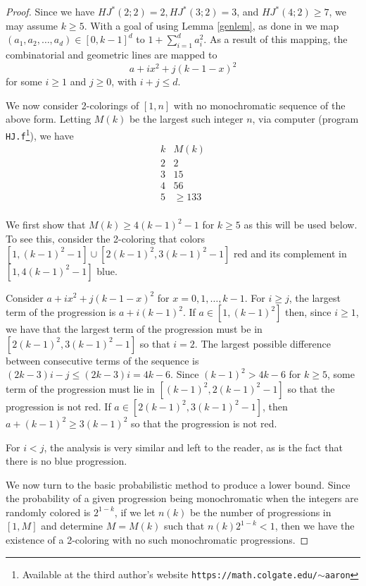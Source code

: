 \documentclass[11pt]{article}
\theoremstyle{definition}
\begin{document}
\begin{proof} Since we have $HJ^*(2;2) = 2, HJ^*(3;2) = 3$, and $HJ^*(4;2) \geq 7 $, we may assume $k \geq 5$.
With a goal of using Lemma \ref{genlem}, as done in \cite{BPV} we map $(a_1,a_2,\dots,a_d) \in [0,k-1]^d$ to $1+\sum_{i=1}^d a_i^2$.
As a result of this mapping, the combinatorial and geometric lines are mapped to
$$
a+ix^2+j(k-1-x)^2
$$
for some $i \geq 1$ and $j \geq 0$, with $i+j \leq d$.

We now consider 2-colorings of $[1,n]$ with no monochromatic sequence
of the above form.  Letting $M(k)$ be the largest such integer $n$,
via computer (program {\tt HJ.f}\footnote{Available at the third author's website {\tt https://math.colgate.edu/$\sim$aaron}}), we have
$$
\begin{array}{l|l}
k&M(k)\\\hline
2&2 \\
3&15 \\
4& 56\\
5& \geq 133 \\
\end{array}
$$

We first show that $M(k) \geq 4(k-1)^2-1$ for $k \geq 5$ as this will be used below.  To see this, consider
the 2-coloring that colors $[1,(k-1)^2-1] \cup [2(k-1)^2, 3(k-1)^2-1]$ red and its
complement in $[1,4(k-1)^2-1]$ blue.

Consider $a+ix^2+j(k-1-x)^2$ for $x=0,1,\dots,k-1$.  For $i \geq j$, the largest term of
the progression is $a+i(k-1)^2$.  
If $a \in [1,(k-1)^2]$ then, since $i \geq 1$, we have
that the largest term of the progression must be in $[2(k-1)^2, 3(k-1)^2-1]$ so that
$i=2$.
The largest possible difference between consecutive terms of the sequence
is $(2k-3)i - j \leq (2k-3)i = 4k-6$.  Since $(k-1)^2 > 4k-6$ for $k\geq 5$, some term of the
progression must lie in $[(k-1)^2, 2(k-1)^2-1]$ so that the progression is not red.
If $a \in [2(k-1)^2, 3(k-1)^2-1]$, then $a+(k-1)^2\geq 3(k-1)^2$ so that the progression
is not red.

For $i<j$, the analysis is very similar and left to the reader, as is the fact that there
is no blue progression.

 

We now turn to the basic probabilistic method to produce a lower bound.
Since the probability of a given progression being monochromatic when the integers are
randomly colored is $2^{1-k}$, if we let $n(k)$ be the number of progressions in $[1,M]$
and determine $M=M(k)$ such that $n(k)2^{1-k} < 1$, then we have the existence of a 2-coloring
with no such monochromatic progressions.


\end{proof}
\end{document}
